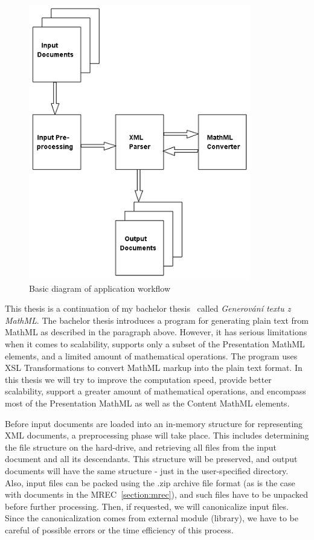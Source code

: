 \documentclass[11pt,oneside,final]{fithesis2}
\begin{document}
\begin{figure}[!ht]
\centering
\includegraphics{basic_diagram}
\caption{Basic diagram of application workflow}
\label{fig:basicworkflow}
\end{figure}

This thesis is a continuation of my bachelor thesis~\cite{Kucbel2011thesis} called \textit{Generování textu z MathML}. The bachelor thesis introduces a program for generating plain text from MathML as described in the paragraph above. However, it has serious limitations when it comes to scalability, supports only a subset of the Presentation MathML elements, and a limited amount of mathematical operations. The program uses XSL Transformations to convert MathML markup into the plain text format. In this thesis we will try to improve the computation speed, provide better scalability, support a greater amount of mathematical operations, and encompass most of the Presentation MathML as well as the Content MathML elements.

Before input documents are loaded into an in-memory structure for representing XML documents, a preprocessing phase will take place. This includes determining the file structure on the hard-drive, and retrieving all files from the input document and all its descendants. This structure will be preserved, and output documents will have the same structure - just in the user-specified directory. Also, input files can be packed using the .zip archive file format (as is the case with documents in the MREC~\ref{section:mrec}), and such files have to be unpacked before further processing. Then, if requested, we will canonicalize input files. Since the canonicalization comes from external module (library), we have to be careful of possible errors or the time efficiency of this process. 
\end{document}
